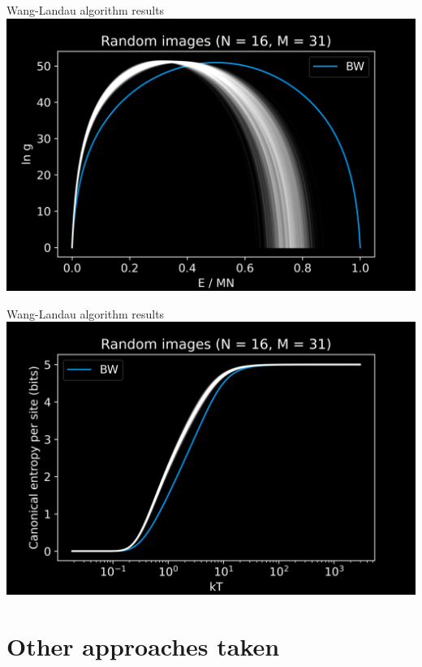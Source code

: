 \documentclass[14pt,c]{beamer}
\begin{document}

\begin{frame}{Wang-Landau algorithm results}
  \centering
  \includegraphics[width=0.9\framewidth]{wanglandau-gray}
\end{frame}

\begin{frame}{Wang-Landau algorithm results}
  \centering
  \includegraphics[width=0.9\framewidth]{wanglandau-gray-S}
\end{frame}

\section{Other approaches taken}
\end{document}
